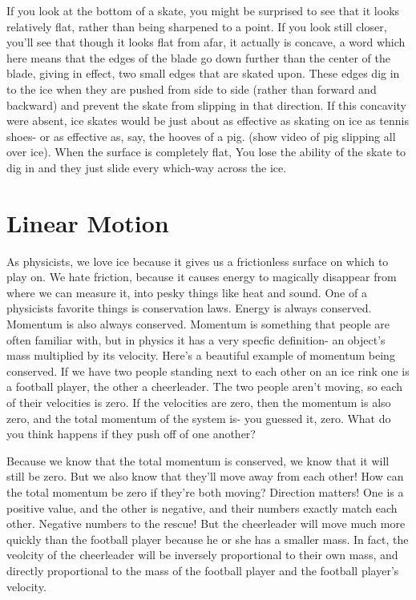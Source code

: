 \documentclass[12pt]{article}
\begin{document}
If you look at the bottom of a skate, you might be surprised to see that it looks relatively
flat, rather than being sharpened to a point. If you look still closer, you'll see that 
though it looks flat from afar, it actually is concave, a word which here means that the
edges of the blade go down further than the center of the blade, giving in effect, two small 
edges that are skated upon. These edges dig in to the ice when they are pushed from side
to side (rather than forward and backward) and prevent the skate from slipping in that direction. 
If this concavity were absent, ice skates would be just about as
effective as skating on ice as tennis shoes- or as effective as, say, the hooves of a pig.
(show video of pig slipping all over ice). When the surface is completely flat, 
You lose the ability of the skate to dig in
and they just slide every which-way across the ice. 

\section{Linear Motion}
As physicists, we love ice because it gives us a frictionless surface on which to play on.
We hate friction, because it causes energy to magically disappear from where we can measure
it, into pesky things like heat and sound. One of a physicists favorite things is conservation 
laws. Energy is always conserved. Momentum is also always conserved. Momentum is something
that people are often familiar with, but in physics it has a very specfic definition-
an object's mass multiplied by its velocity.
Here's a beautiful example of momentum being conserved. If we have two people standing next to each other on 
an ice rink one is a football player, the other a cheerleader. The two people aren't moving,
so each of their velocities is zero. If the velocities are zero, then the momentum is 
also zero, and the total momentum of the system is- you guessed it, zero. 
What do you think happens if they push off of one another? 

Because we know that the total momentum is conserved, we know that it will still be zero.
But we also know that they'll move away from each other! How can the total momentum be
zero if they're both moving? Direction matters! One is a positive value, and the other
is negative, and their numbers exactly match each other. Negative numbers to the 
rescue!
But the cheerleader will move much more quickly
than the football player because he or she has a smaller mass. In fact, the veolcity 
of the cheerleader will be inversely proportional to their own mass, and directly 
proportional to the mass of the football player and the football player's velocity. 
\end{document}
